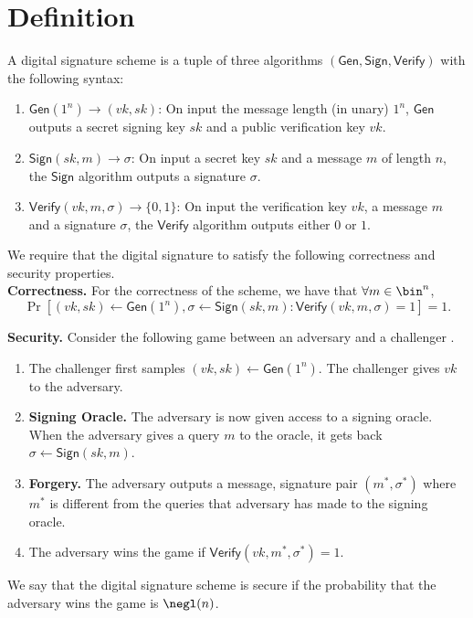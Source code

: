 \documentclass[12pt]{tufte-book}
\newcommand{\Gen}{\mathsf{Gen}}
\newcommand{\Sign}{\mathsf{Sign}}
\newcommand{\Verify}{\mathsf{Verify}}
\begin{document}
\section{Definition}

A digital signature scheme is a tuple of three algorithms $(\Gen,\Sign,\Verify)$ with the following syntax:
\begin{enumerate}
\item $\Gen(1^n)\to (vk,sk)$: On input the message length (in unary) $1^n$, $\Gen$ outputs a secret signing key $sk$ and a public verification key $vk$.
\item $\Sign(sk, m) \to \sigma$: On input a secret key $sk$ and a message $m$ of length $n$, the $\Sign$ algorithm outputs a signature $\sigma$.
\item $\Verify(vk, m, \sigma) \to \{0,1\}$: On input the verification key $vk$, a message $m$ and a signature $\sigma$, the $\Verify$ algorithm outputs either $0$ or $1$.
\end{enumerate}

We require that the digital signature to satisfy the following correctness and security properties.\\
\medskip
\noindent\textbf{Correctness.} For the correctness of the scheme, we have that
$\forall m \in \bin^n$,
\[\Pr \left[ (vk,sk) \gets \Gen(1^n), \sigma \leftarrow \Sign(sk,m) : \Verify(vk, m, \sigma) = 1 \right] = 1.\]

\medskip
\noindent\textbf{Security.} Consider the following game between an adversary and a challenger
.

\begin{enumerate}
    \item The challenger first samples $(vk,sk) \gets \Gen(1^n)$. The challenger gives $vk$ to the adversary.
    \item \textbf{Signing Oracle.} The adversary is now given access to a signing oracle. When the adversary gives a query $m$ to the oracle, it gets back $\sigma \gets \Sign(sk,m)$.
    \item \textbf{Forgery.} The adversary outputs a message, signature pair $(m^*,\sigma^*)$ where $m^*$ is different from the queries that adversary has made to the signing oracle.
    \item The adversary wins the game if $\Verify(vk,m^*,\sigma^*) = 1$.
\end{enumerate}
We say that the digital signature scheme is secure if the probability that the adversary wins the game is $\negl(n)$.
\end{document}
